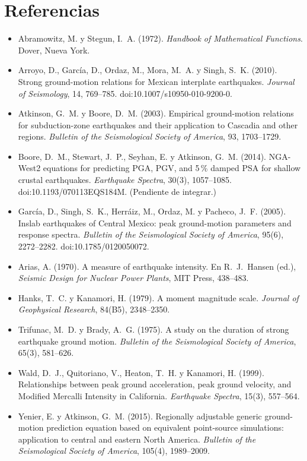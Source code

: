 \documentclass[11pt,a4paper]{article}
\begin{document}
\section*{Referencias}
\begin{itemize}
  \item Abramowitz, M. y Stegun, I.~A. (1972). \emph{Handbook of Mathematical Functions}. Dover, Nueva
        York.
  \item Arroyo, D., García, D., Ordaz, M., Mora, M.~A. y Singh, S.~K. (2010). Strong ground-motion
        relations for Mexican interplate earthquakes. \emph{Journal of Seismology}, 14, 769--785.
        doi:10.1007/s10950-010-9200-0.
  \item Atkinson, G.~M. y Boore, D.~M. (2003). Empirical ground-motion relations for subduction-zone
        earthquakes and their application to Cascadia and other regions. \emph{Bulletin of the
        Seismological Society of America}, 93, 1703--1729.
  \item Boore, D.~M., Stewart, J.~P., Seyhan, E. y Atkinson, G.~M. (2014). NGA-West2 equations for
        predicting PGA, PGV, and 5\,\% damped PSA for shallow crustal earthquakes. \emph{Earthquake
        Spectra}, 30(3), 1057--1085. doi:10.1193/070113EQS184M. (Pendiente de integrar.)
  \item García, D., Singh, S.~K., Herráiz, M., Ordaz, M. y Pacheco, J.~F. (2005). Inslab earthquakes of
        Central Mexico: peak ground-motion parameters and response spectra. \emph{Bulletin of the
        Seismological Society of America}, 95(6), 2272--2282. doi:10.1785/0120050072.
  \item Arias, A. (1970). A measure of earthquake intensity. En R.~J.~Hansen (ed.), \emph{Seismic Design
        for Nuclear Power Plants}, MIT Press, 438--483.
  \item Hanks, T.~C. y Kanamori, H. (1979). A moment magnitude scale. \emph{Journal of Geophysical
        Research}, 84(B5), 2348--2350.
  \item Trifunac, M.~D. y Brady, A.~G. (1975). A study on the duration of strong earthquake ground motion.
        \emph{Bulletin of the Seismological Society of America}, 65(3), 581--626.
  \item Wald, D.~J., Quitoriano, V., Heaton, T.~H. y Kanamori, H. (1999). Relationships between peak
        ground acceleration, peak ground velocity, and Modified Mercalli Intensity in California.
        \emph{Earthquake Spectra}, 15(3), 557--564.
  \item Yenier, E. y Atkinson, G.~M. (2015). Regionally adjustable generic ground-motion prediction
        equation based on equivalent point-source simulations: application to central and eastern North
        America. \emph{Bulletin of the Seismological Society of America}, 105(4), 1989--2009.
\end{itemize}
\end{document}

